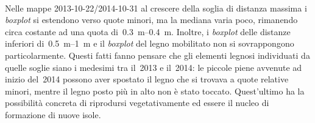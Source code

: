 \\
Nelle mappe 2013-10-22/2014-10-31 al crescere della soglia di distanza massima i \emph{boxplot} si estendono verso quote minori, ma la mediana varia poco, rimanendo circa costante ad una quota di~\SIrange[range-phrase = {-}, range-units = single]{0.3}{0.4}{\m}.
Inoltre, i \emph{boxplot} delle distanze inferiori di~\SIrange[range-phrase = { e }]{0.5}{1}{\m} e il \emph{boxplot} del legno mobilitato non si sovrappongono particolarmente.
Questi fatti fanno pensare che gli elementi legnosi individuati da quelle soglie siano i medesimi tra il~2013 e il~2014: le piccole piene avvenute ad inizio del~2014 possono aver spostato il legno che si trovava a quote relative minori, mentre il legno posto più in alto non è stato toccato.
Quest'ultimo ha la possibilità concreta di riprodursi vegetativamente ed essere il nucleo di formazione di nuove isole.


